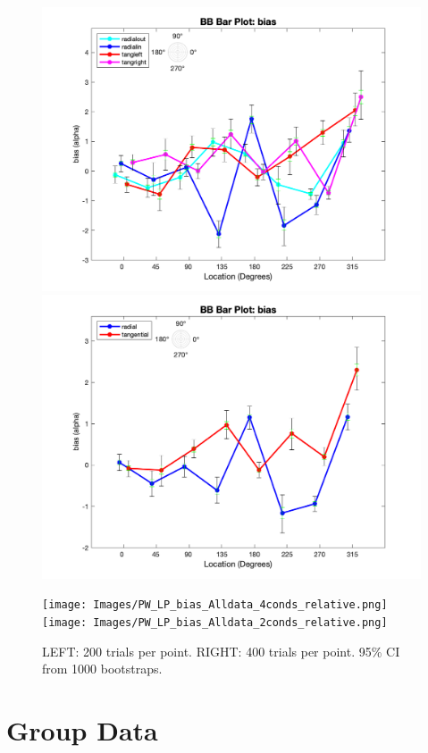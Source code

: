 \documentclass[11pt]{article} %
\begin{document}
\begin{figure}[H]
\centering %
\includegraphics[scale=.3]{Images/BB_LP_bias_Alldata_4conds.png}
\includegraphics[scale=.3]{Images/BB_LP_bias_Alldata_2conds.png}
\end{figure}
\begin{figure}[H]
\centering %
\texttt{[image: Images/PW\_LP\_bias\_Alldata\_4conds\_relative.png]}
\texttt{[image: Images/PW\_LP\_bias\_Alldata\_2conds\_relative.png]}
\caption{LEFT: 200 trials per point. RIGHT: 400 trials per point. 95\% CI from 1000 bootstraps.}
\end{figure}

\newpage
\section{Group Data}
\end{document}
